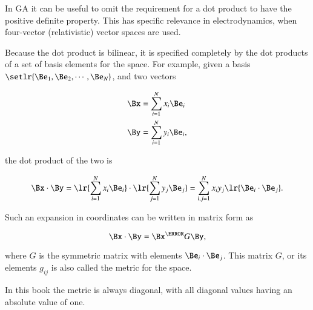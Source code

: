 In GA it can be useful to omit the requirement for a dot product to have the positive definite property.  This has specific relevance in electrodynamics, when four-vector (relativistic) vector spaces are used.

Because the dot product is bilinear, it is
specified completely by the dot products of a set of basis elements for the space.  For example,
given a basis \( \setlr{ \Be_1, \Be_2, \cdots, \Be_N} \), and two vectors

\begin{dmath}\label{eqn:multivector:240}
\begin{aligned}
   \Bx &= \sum_{i = 1}^N x_i \Be_i \\
   \By &= \sum_{i = 1}^N y_i \Be_i,
\end{aligned}
\end{dmath}

the dot product of the two is

\begin{dmath}\label{eqn:prerequisites:260}
\Bx \cdot \By
=
   \lr{ \sum_{i = 1}^N x_i \Be_i } \cdot
   \lr{ \sum_{j = 1}^N y_j \Be_j }
=
   \sum_{i,j = 1}^N x_i y_j \lr{ \Be_i \cdot \Be_j }.
\end{dmath}

Such an expansion in coordinates can be written in matrix form as

\begin{dmath}\label{eqn:prerequisites:280}
\Bx \cdot \By
=
\Bx^\T G \By,
\end{dmath}

where \( G \) is the symmetric matrix with elements \( \Be_i \cdot \Be_j \).  This matrix \( G \), or its elements \( g_{ij} \) is also called the metric for the space.

In this book the metric is always diagonal, with all diagonal values having an absolute value of one.


